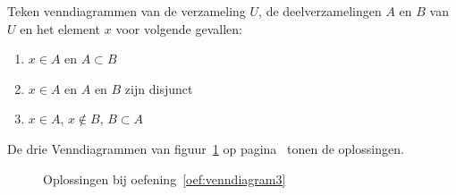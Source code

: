 \begin{oef}
\label{oef:venndiagram3}
Teken venndiagrammen van de verzameling $U$, de deelverzamelingen $A$ en $B$ van $U$ en het element $x$ voor volgende gevallen:
\begin{enumerate}
\item $x\in A$ en $A\subset B$
\item $x\in A$ en $A$ en $B$ zijn disjunct
\item $x\in A$, $x\not \in B$, $B\subset A$
\end{enumerate}
\begin{opl}
De drie Venndiagrammen van figuur~\ref{fig:Venn3} op pagina~\pageref{fig:Venn3} tonen de oplossingen.
\begin{figure}[h!tbp]
\centering
\subfloat[oef a]{}\qquad
\subfloat[oef b]{}\qquad
\subfloat[oef c]{}
\caption{Oplossingen bij oefening~\ref{oef:venndiagram3} }
\label{fig:Venn3}
\end{figure}
\end{opl}
\end{oef}



